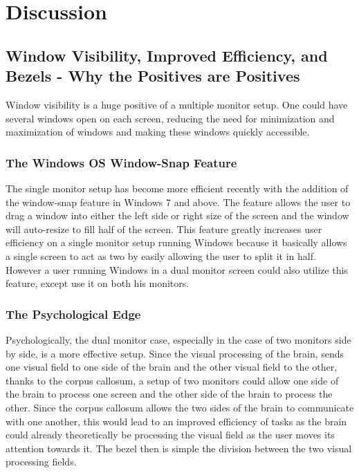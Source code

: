 \documentclass[a4paper]{article}
\begin{document}
\section{Discussion}
\subsection{Window Visibility, Improved Efficiency, and Bezels - Why the Positives are Positives}
Window visibility is a huge positive of a multiple monitor setup. One could have several windows open on each screen, reducing the need for minimization and maximization of windows and making these windows quickly accessible. 
\subsubsection{The Windows OS Window-Snap Feature}
The single monitor setup has become more efficient recently with the addition of the window-snap feature in Windows 7 and above. The feature allows the user to drag a window into either the left side or right size of the screen and the window will auto-resize to fill half of the screen. This feature greatly increases user efficiency on a single monitor setup running Windows because it basically allows a single screen to act as two by easily allowing the user to split it in half. However a user running Windows in a dual monitor screen could also utilize this feature, except use it on both his monitors.
\subsubsection{The Psychological Edge}
Psychologically, the dual monitor case, especially in the case of two monitors side by side, is a more effective setup. Since the visual processing of the brain, sends one visual field to one side of the brain and the other visual field to the other, thanks to the corpus callosum, a setup of two monitors could allow one side of the brain to process one screen and the other side of the brain to process the other. Since the corpus callosum allows the two sides of the brain to communicate with one another, this would lead to an improved efficiency of tasks as the brain could already theoretically be processing the visual field as the user moves its attention towards it. The bezel then is simple the division between the two visual processing fields.
\end{document}
